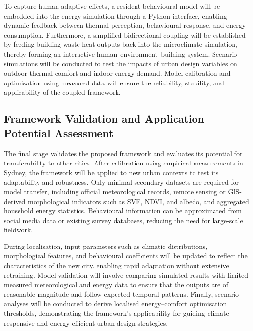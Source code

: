 To capture human adaptive effects, a resident behavioural model will be embedded into the energy simulation through a Python interface, enabling dynamic feedback between thermal perception, behavioural response, and energy consumption. Furthermore, a simplified bidirectional coupling will be established by feeding building waste heat outputs back into the microclimate simulation, thereby forming an interactive human--environment--building system. Scenario simulations will be conducted to test the impacts of urban design variables on outdoor thermal comfort and indoor energy demand. Model calibration and optimisation using measured data will ensure the reliability, stability, and applicability of the coupled framework.

\subsection{Framework Validation and Application Potential Assessment}

The final stage validates the proposed framework and evaluates its potential for transferability to other cities. After calibration using empirical measurements in Sydney, the framework will be applied to new urban contexts to test its adaptability and robustness. Only minimal secondary datasets are required for model transfer, including official meteorological records, remote sensing or GIS-derived morphological indicators such as SVF, NDVI, and albedo, and aggregated household energy statistics. Behavioural information can be approximated from social media data or existing survey databases, reducing the need for large-scale fieldwork.

During localisation, input parameters such as climatic distributions, morphological features, and behavioural coefficients will be updated to reflect the characteristics of the new city, enabling rapid adaptation without extensive retraining. Model validation will involve comparing simulated results with limited measured meteorological and energy data to ensure that the outputs are of reasonable magnitude and follow expected temporal patterns. Finally, scenario analyses will be conducted to derive localised energy--comfort optimisation thresholds, demonstrating the framework's applicability for guiding climate-responsive and energy-efficient urban design strategies.
